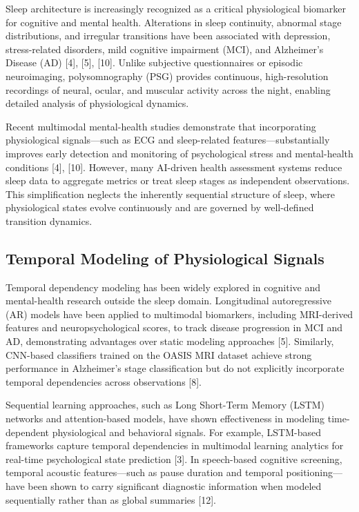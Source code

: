 \documentclass[10pt]{cai26}
\begin{document}
Sleep architecture is increasingly recognized as a critical physiological biomarker for cognitive and mental health. Alterations in sleep continuity, abnormal stage distributions, and irregular transitions have been associated with depression, stress-related disorders, mild cognitive impairment (MCI), and Alzheimer's Disease (AD) [4], [5], [10]. Unlike subjective questionnaires or episodic neuroimaging, polysomnography (PSG) provides continuous, high-resolution recordings of neural, ocular, and muscular activity across the night, enabling detailed analysis of physiological dynamics.

Recent multimodal mental-health studies demonstrate that incorporating physiological signals---such as ECG and sleep-related features---substantially improves early detection and monitoring of psychological stress and mental-health conditions [4], [10]. However, many AI-driven health assessment systems reduce sleep data to aggregate metrics or treat sleep stages as independent observations. This simplification neglects the inherently sequential structure of sleep, where physiological states evolve continuously and are governed by well-defined transition dynamics.

\subsection{Temporal Modeling of Physiological Signals}

Temporal dependency modeling has been widely explored in cognitive and mental-health research outside the sleep domain. Longitudinal autoregressive (AR) models have been applied to multimodal biomarkers, including MRI-derived features and neuropsychological scores, to track disease progression in MCI and AD, demonstrating advantages over static modeling approaches [5]. Similarly, CNN-based classifiers trained on the OASIS MRI dataset achieve strong performance in Alzheimer's stage classification but do not explicitly incorporate temporal dependencies across observations [8].

Sequential learning approaches, such as Long Short-Term Memory (LSTM) networks and attention-based models, have shown effectiveness in modeling time-dependent physiological and behavioral signals. For example, LSTM-based frameworks capture temporal dependencies in multimodal learning analytics for real-time psychological state prediction [3]. In speech-based cognitive screening, temporal acoustic features---such as pause duration and temporal positioning---have been shown to carry significant diagnostic information when modeled sequentially rather than as global summaries [12].
\end{document}
